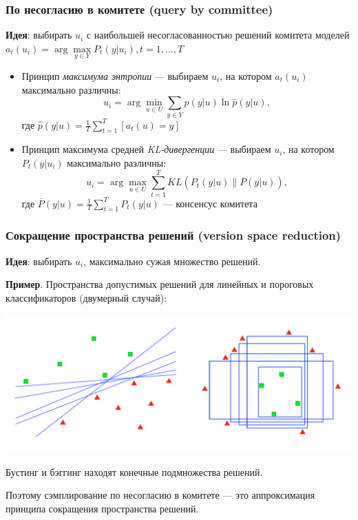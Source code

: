 \documentclass[fullscreen=true, bookmarks=true, hyperref={pdfencoding=unicode}]{beamer}
\begin{document}
\begin{frame}
  \frametitle{По несогласию в комитете (query by committee)}

  {\bf Идея}: выбирать $u_i$ с наибольшей несогласованностью решений
  комитета моделей $a_t(u_i) = \arg\max\limits_{y \in Y} P_t(y|u_i), t=1, \dots, T$

  \begin{itemize}
    \item Принцип {\it максимума энтропии} —
      выбираем $u_i$, на котором $a_t(u_i)$ максимально различны:
      $$ u_i = \arg\min\limits_{u \in U} \sum\limits_{y\in Y} \hat p(y|u) \ln \hat p(y|u), $$
      где $\hat p(y|u) = \frac{1}{T} \sum\limits_{t=1}^T \left[a_t(u) = y \right]$
    \item Принцип максимума средней {\it KL-дивергенции} —
      выбираем $u_i$, на котором $P_t(y|u_i)$ максимально различны:
      $$ u_i = \arg\max\limits_{u \in U} \sum\limits_{t=1}^T KL \left(P_t (y|u) \| \overline P (y|u)\right), $$
      где $\overline P (y|u) = \frac{1}{T} \sum\limits_{t=1}^T P_t(y|u)$ — консенсус комитета
  \end{itemize}

\end{frame}


\begin{frame}
  \frametitle{Сокращение пространства решений (version space reduction)}

  {\bf Идея}: выбирать $u_i$, максимально сужая множество решений.

  {\bf Пример}. Пространства допустимых решений для линейных и пороговых классификаторов (двумерный случай):

  \begin{center}
    \includegraphics[keepaspectratio,
                     width=.7\paperwidth]{solution_space.png}
  \end{center}

  Бустинг и бэггинг находят конечные подмножества решений.

  Поэтому сэмплирование по несогласию в комитете — это аппроксимация принципа сокращения пространства решений.

\end{frame}
\end{document}
